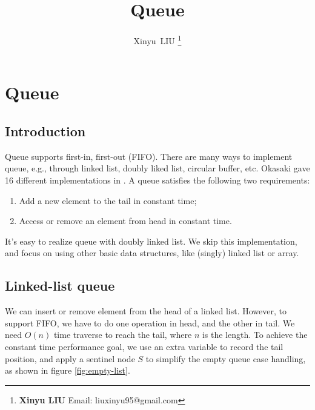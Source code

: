 \documentclass[b5paper]{article}
\begin{document}
\title{Queue}

\author{Xinyu~LIU
\thanks{{\bfseries Xinyu LIU} \newline
  Email: liuxinyu95@gmail.com \newline}
  }

\maketitle
\fi


\ifx\wholebook\relax
\chapter{Queue}
\fi

\section{Introduction}
\label{introduction}

Queue supports first-in, first-out (FIFO). There are many ways to implement queue, e.g., through linked list, doubly liked list, circular buffer, etc. Okasaki gave 16 different implementations in \cite{okasaki-book}. A queue satisfies the following two requirements:

\begin{enumerate}
\item Add a new element to the tail in constant time;
\item Access or remove an element from head in constant time.
\end{enumerate}

It's easy to realize queue with doubly linked list. We skip this implementation, and focus on using other basic data structures, like (singly) linked list or array.

\section{Linked-list queue}

We can insert or remove element from the head of a linked list. However, to support FIFO, we have to do one operation in head, and the other in tail. We need $O(n)$ time traverse to reach the tail, where $n$ is the length. To achieve the constant time performance goal, we use an extra variable to record the tail position, and apply a sentinel node $S$ to simplify the empty queue case handling, as shown in figure \ref{fig:empty-list}.
\end{document}
